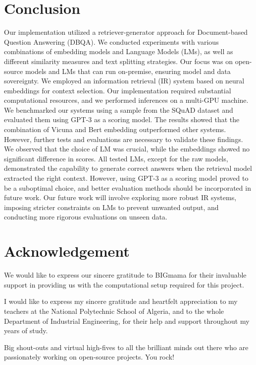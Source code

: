 \documentclass[a4paper,12pt]{article}
\begin{document}
\section{Conclusion}
Our implementation utilized a retriever-generator approach for Document-based Question Answering (DBQA). 
We conducted experiments with various combinations of embedding models and Language Models (LMs), as well as different similarity measures and text splitting strategies. Our focus was on open-source models and LMs that can run on-premise, ensuring model and data sovereignty.
We employed an information retrieval (IR) system based on neural embeddings for context selection. 
Our implementation required substantial computational resources, and we performed inferences on a multi-GPU machine.
We benchmarked our systems using a sample from the SQuAD dataset and evaluated them using GPT-3 \cite{gpt3} as a scoring model. The results showed that the combination of Vicuna \cite{vicuna} and Bert \cite{bert} embedding outperformed other systems. 
However, further tests and evaluations are necessary to validate these findings.
We observed that the choice of LM was crucial, while the embeddings showed no significant difference in scores. All tested LMs, except for the raw models, demonstrated the capability to generate correct answers when the retrieval model extracted the right context. 
However, using GPT-3 as a scoring model proved to be a suboptimal choice, and better evaluation methods should be incorporated in future work.
Our future work will involve exploring more robust IR systems, imposing stricter constraints on LMs to prevent unwanted output, and conducting more rigorous evaluations on unseen data.

\section{Acknowledgement}
We would like to express our sincere gratitude to BIGmama for their invaluable support in providing us with the computational setup required for this project.

I would like to express my sincere gratitude and heartfelt appreciation to my teachers at the National Polytechnic School of Algeria, 
and to the whole Department of Industrial Engineering, for their help and support throughout my years of study.

Big shout-outs and virtual high-fives to all the brilliant minds out there who are passionately working on open-source projects. You rock!
\end{document}
